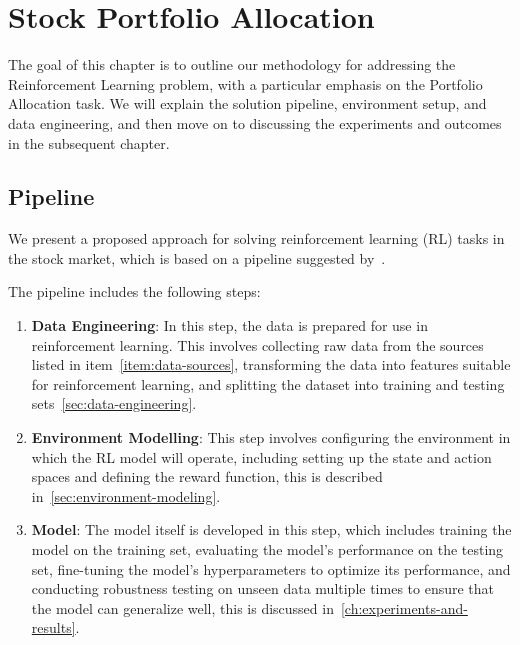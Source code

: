 \documentclass[../xlapes02]{subfiles}
\begin{document}
    \chapter{Stock Portfolio Allocation}\label{ch:stock-portfolio-allocation}
    The goal of this chapter is to outline our methodology for addressing the Reinforcement Learning problem, with a particular emphasis on the Portfolio Allocation task. We will explain the solution pipeline, environment setup, and data engineering, and then move on to discussing the experiments and outcomes in the subsequent chapter.


    \section{Pipeline}
    We present a proposed approach for solving reinforcement learning (RL) tasks in the stock market, which is based on a pipeline suggested by~\cite{liu2022finrlmeta}.


    The pipeline includes the following steps:
    \begin{enumerate}
        \label{item:pipeline}
        \item \textbf{Data Engineering}: In this step, the data is prepared for use in reinforcement learning. This involves collecting raw data from the sources listed in item~\cref{item:data-sources}, transforming the data into features suitable for reinforcement learning, and splitting the dataset into training and testing sets~\cref{sec:data-engineering}.
        \item \textbf{Environment Modelling}: This step involves configuring the environment in which the RL model will operate, including setting up the state and action spaces and defining the reward function, this is described in~\cref{sec:environment-modeling}.
        \item \textbf{Model}: The model itself is developed in this step, which includes training the model on the training set, evaluating the model's performance on the testing set, fine-tuning the model's hyperparameters to optimize its performance, and conducting robustness testing on unseen data multiple times to ensure that the model can generalize well, this is discussed in~\cref{ch:experiments-and-results}.
    \end{enumerate}
\end{document}
